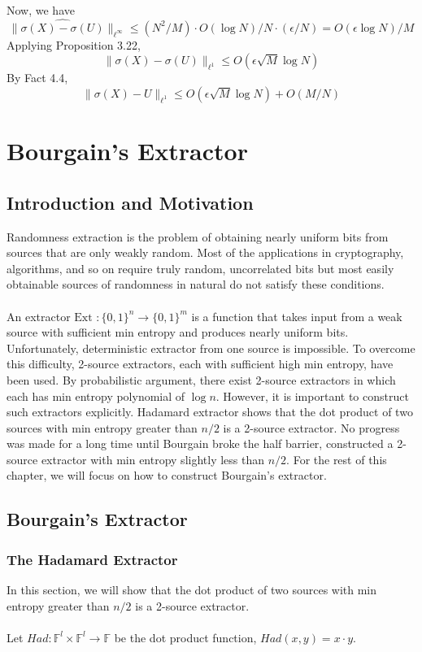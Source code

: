 \noindent Now, we have
$$\|\widehat{ \sigma(X) - \sigma(U)} \|_{\ell^{\infty}} \leq (N^2/M)\cdot O(\log N)/N \cdot (\epsilon/N) = O(\epsilon \log N)/M$$ 
Applying Proposition 3.22, 
$$\|\sigma(X) - \sigma(U) \|_{\ell^{1}} \leq O(\epsilon \sqrt{M}\log N)$$
By Fact 4.4, 
$$\|\sigma(X) - U \|_{\ell^{1}} \leq O(\epsilon \sqrt{M}\log N) + O(M/N)$$ 
\chapter{Bourgain's Extractor}

\section{Introduction and Motivation}

Randomness extraction is the problem of obtaining nearly uniform bits from sources that are 	only weakly random. Most of the applications in cryptography, algorithms, and so on require truly random, uncorrelated bits but most easily obtainable sources of randomness in natural do not satisfy these conditions. \\ \\
An extractor $\text{Ext } : \{ 0,1 \}^n \rightarrow \{0, 1 \} ^m$ is a function that takes input from a weak source with sufficient min entropy and produces nearly uniform bits. Unfortunately, deterministic extractor from one source is impossible. To overcome this difficulty, 2-source extractors, each with sufficient high min entropy, have been used. By probabilistic argument, there exist 2-source extractors in which each has min entropy polynomial of $\log n$. However, it is important to construct such extractors explicitly. Hadamard extractor shows that the dot product of two sources with min entropy greater than $n/2$ is a 2-source extractor. No progress was made for a long time until Bourgain broke the half barrier, constructed a 2-source extractor with min entropy slightly less than $n/2$. For the rest of this chapter, we will focus on how to construct Bourgain's extractor.

\section{Bourgain's Extractor}

\subsection{The Hadamard Extractor}
In this section, we will show that the dot product of two sources with min entropy greater than $n/2$ is a 2-source extractor. \\ \\
Let $Had: \mathbb{F}^l \times \mathbb{F}^l \rightarrow \mathbb{F}$ be the dot product function, $Had(x,y) = x \cdot y$. \\ \\


